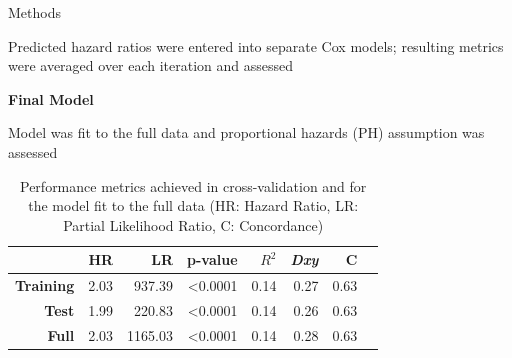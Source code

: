\documentclass[final]{beamer}
\newlength{\onecolwid}
\begin{document}
\begin{frame}[t]
\begin{columns}[t]
\begin{column}{\onecolwid}
\begin{block}{Methods}
\vspace{0.5ex}

Predicted hazard ratios were entered into separate Cox models; resulting metrics were averaged over each iteration and assessed


% 
% 

\vspace{1ex}

\textcolor{dblue!70}{} \textcolor{dblue!70}{\textbf{Final Model}} 

\vspace{0.5ex}

Model was fit to the full data and proportional hazards (PH) assumption was assessed

\vspace{1.5ex}

\end{block}


% 

\begin{table}[!htbp]
\captionsetup{skip=40pt}
\vspace{2ex}
\begin{tabular}{|r|r|r|r|r|r|r|r|}
  \hline
  & \textbf{HR} & \textbf{LR} & \textbf{p-value} & \textbf{$R^2$} & \textbf{\textit{Dxy}} & \textbf{C} \\
  \hline
  \textbf{Training} & 2.03 & 937.39  & \textless0.0001 & 0.14 & 0.27 & 0.63 \\
  \textbf{Test}     & 1.99 & 220.83  & \textless0.0001 & 0.14 & 0.26 & 0.63 \\
  \textbf{Full}     & 2.03 & 1165.03 & \textless0.0001 & 0.14 & 0.28 & 0.63 \\
  \hline
\end{tabular}
\caption{Performance metrics achieved in cross-validation and for the model fit to the full data (HR: Hazard Ratio, LR: Partial Likelihood Ratio, C: Concordance)}
\label{table:1}
\end{table}


\end{column}
\end{columns}
\end{frame}
\end{document}
